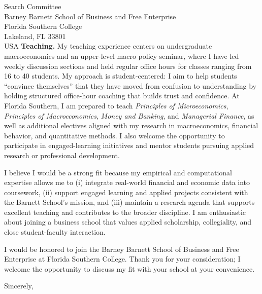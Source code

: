 \documentclass[11pt,letterpaper]{letter}
\begin{document}
\begin{letter}{Search Committee \\
Barney Barnett School of Business and Free Enterprise \\
Florida Southern College \\
Lakeland, FL 33801 \\ USA}
\textbf{Teaching.} My teaching experience centers on undergraduate macroeconomics and an upper-level macro policy seminar, where I have led weekly discussion sections and held regular office hours for classes ranging from 16 to 40 students. My approach is student-centered: I aim to help students “convince themselves” that they have moved from confusion to understanding by holding structured office-hour coaching that builds trust and confidence. At Florida Southern, I am prepared to teach \textit{Principles of Microeconomics}, \textit{Principles of Macroeconomics}, \textit{Money and Banking}, and \textit{Managerial Finance}, as well as additional electives aligned with my research in macroeconomics, financial behavior, and quantitative methods. I also welcome the opportunity to participate in engaged-learning initiatives and mentor students pursuing applied research or professional development.

I believe I would be a strong fit because my empirical and computational expertise allows me to (i) integrate real-world financial and economic data into coursework, (ii) support engaged learning and applied projects consistent with the Barnett School’s mission, and (iii) maintain a research agenda that supports excellent teaching and contributes to the broader discipline. I am enthusiastic about joining a business school that values applied scholarship, collegiality, and close student-faculty interaction.

I would be honored to join the Barney Barnett School of Business and Free Enterprise at Florida Southern College. Thank you for your consideration; I welcome the opportunity to discuss my fit with your school at your convenience.

\closing{Sincerely,}

\end{letter}
\end{document}
